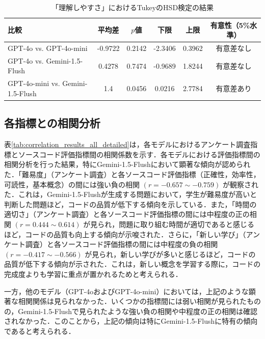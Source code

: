 \documentclass[11pt]{jreport}
\begin{document}
\begin{table}[h]
  \centering
  \caption{「理解しやすさ」におけるTukeyのHSD検定の結果}
  \label{tab:tukey_hsd_understanding}
  \begin{tabular}{lccccc}
    \hline
    比較 & 平均差 & $p$値 & 下限 & 上限 & 有意性（5\%水準） \\
    \hline
    GPT-4o vs. GPT-4o-mini & -0.9722 & 0.2142 & -2.3406 & 0.3962 & 有意差なし \\
    GPT-4o vs. Gemini-1.5-Flush & 0.4278 & 0.7474 & -0.9689 & 1.8244 & 有意差なし \\
    GPT-4o-mini vs. Gemini-1.5-Flush & 1.4 & 0.0456 & 0.0216 & 2.7784 & 有意差あり \\
    \hline
  \end{tabular}
\end{table}

\subsection{各指標との相関分析}
表\ref{tab:correlation_results_all_detailed}は，各モデルにおけるアンケート調査指標とソースコード評価指標間の相関係数を示す．各モデルにおける評価指標間の相関分析を行った結果，特にGemini-1.5-Flushにおいて顕著な傾向が認められた．「難易度」（アンケート調査）と各ソースコード評価指標（正確性，効率性，可読性，基本概念）の間には強い負の相関 $(r=−0.657\sim−0.759)$ が観察された．これは，Gemini-1.5-Flushが生成する問題において，学生が難易度が高いと判断した問題ほど，コードの品質が低下する傾向を示している．また，「時間の適切さ」（アンケート調査）と各ソースコード評価指標の間には中程度の正の相関 $ (r=0.444\sim0.614) $ が見られ，問題に取り組む時間が適切であると感じるほど，コードの品質も向上する傾向が示唆された．さらに，「新しい学び」（アンケート調査）と各ソースコード評価指標の間には中程度の負の相関 $(r=−0.417\sim−0.566)$ が見られ，新しい学びが多いと感じるほど，コードの品質が低下する傾向が示された．これは，新しい概念を学習する際に，コードの完成度よりも学習に重点が置かれるためと考えられる．

一方，他のモデル（GPT-4oおよびGPT-4o-mini）においては，上記のような顕著な相関関係は見られなかった．いくつかの指標間には弱い相関が見られたものの，Gemini-1.5-Flushで見られたような強い負の相関や中程度の正の相関は確認されなかった．このことから，上記の傾向は特にGemini-1.5-Flushに特有の傾向であると考えられる．
\end{document}
